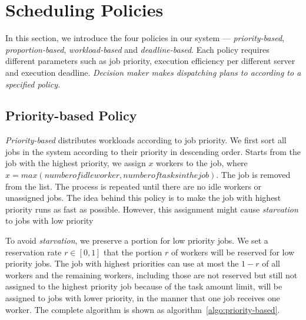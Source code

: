 \section{Scheduling Policies}\label{sec:policy}

In this section, we introduce the four policies in our system ---
\emph{priority-based}, \emph{proportion-based}, \emph{workload-based}
and \emph{deadline-based}.
Each policy requires different parameters such as job priority,
execution efficiency per different server and execution deadline.
\em{Decision maker} makes dispatching plans to according to a specified
policy.



\subsection{Priority-based Policy}	%

\emph{Priority-based} distributes workloads according to job priority. 
We first sort all jobs in the system according to their priority in 
descending order.
Starts from the job with the highest priority, we assign $x$ workers to
the job, where $x = max(number of idle worker, number of tasks in the 
job)$.
The job is removed from the list.
The process is repeated until there are no idle workers or unassigned 
jobs.
The idea behind this policy is to make the job with highest priority 
runs as fast as possible.
However, this assignment might cause \emph{starvation} to jobs with 
low priority

To avoid \emph{starvation}, we preserve a portion for low priority jobs.
We set a reservation rate $r \in [0,1]$ that the portion $r$ of workers
will be reserved for low priority jobs.
The job with highest priorities can use at most the $1-r$ of all workers
and the remaining workers, including those are not reserved but still not
assigned to the highest priority job because of the task amount limit,
will be assigned to jobs with lower priority, in the manner that one job
receives one worker.
The complete algorithm is shown as algorithm~\ref{algo:priority-based}.

